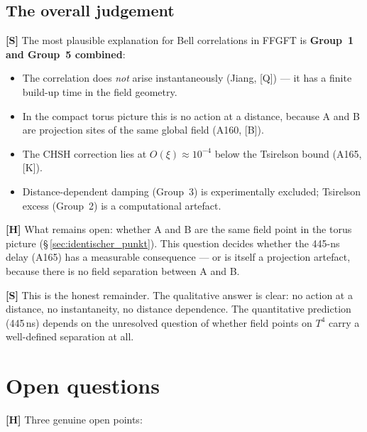 \subsection{The overall judgement}

\textbf{[S]} The most plausible explanation for Bell correlations in
FFGFT is \textbf{Group~1 and Group~5 combined}:

\begin{itemize}[leftmargin=1.4em,itemsep=0.3em]
  \item The correlation does \emph{not} arise instantaneously
        (Jiang, [Q]) --- it has a finite build-up time in the field
        geometry.
  \item In the compact torus picture this is no action at a distance,
        because A and B are projection sites of the same global field
        (A160, [B]).
  \item The CHSH correction lies at $O(\xi) \approx 10^{-4}$ below
        the Tsirelson bound (A165, [K]).
  \item Distance-dependent damping (Group~3) is experimentally
        excluded; Tsirelson excess (Group~2) is a computational artefact.
\end{itemize}

\textbf{[H]} What remains open: whether A and B are the same field
point in the torus picture (§\,\ref{sec:identischer_punkt}). This
question decides whether the 445-ns delay (A165) has a measurable
consequence --- or is itself a projection artefact, because there is
no field separation between A and B.

\textbf{[S]} This is the honest remainder. The qualitative answer is
clear: no action at a distance, no instantaneity, no distance dependence.
The quantitative prediction (445\,ns) depends on the unresolved question
of whether field points on $T^4$ carry a well-defined separation at all.

\section{Open questions}

\textbf{[H]} Three genuine open points:

